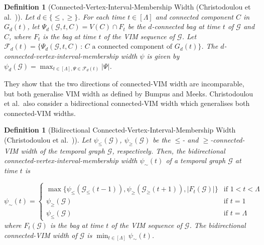 \documentclass[a4paper,UKenglish,cleveref, autoref, thm-restate]{lipics-v2021} %
\newcounter{ctheorem}
\newtheorem{defn}[ctheorem]{Definition}
\begin{document}
\begin{defn}[Connected-Vertex-Interval-Membership Width (Christodoulou et al.~\cite{christodoulou_making_2024})]\label{def:CVIM}
    Let $d\in\{\leq, \geq\}$. For each time $t\in[\Lambda]$ and connected component $C$ in $G_{d}(t)$, let $\Psi_d(\mathcal{G},t,C)=V(C)\cap F_t$ be the $d$\emph{-connected bag} at time $t$ of $\mathcal{G}$ and $C$, where $F_t$ is the bag at time $t$ of the VIM sequence of $\mathcal{G}$. Let $\mathcal{F}_d(t)=\{\Psi_d(\mathcal{G},t,C)\, :\, C\text{ a connected component of }G_d(t)\}$. The \emph{$d$-connected-vertex-interval-membership width} $\psi$ is given by $\psi_d(\mathcal{G})=\max_{t\in[\Lambda],\Psi\in\mathcal{F}_d(t)}|\Psi|$.
\end{defn}
They show that the two directions of connected-VIM width are incomparable, but both generalise VIM width as defined by Bumpus and Meeks. Christodoulou et al.~also consider a bidirectional connected-VIM width which generalises both connected-VIM widths.%
\begin{defn}[Bidirectional Connected-Vertex-Interval-Membership Width (Christodoulou et al.~\cite{christodoulou_making_2024})]
    Let $\psi_{\leq}(\mathcal{G})$, $\psi_{\geq}(\mathcal{G})$ be the $\leq$- and $\geq$-connected-VIM width of the temporal graph $\mathcal{G}$, respectively. Then, the bidirectional connected-vertex-interval-membership width $\psi_{\sim}(t)$ of a temporal graph $\mathcal{G}$ at time $t$ is
    
    $
       \psi_{\sim}(t) =\left\{ \begin{array}{ll} \max\{\psi_{\leq}(\mathcal{G}_{\leq}(t-1)),\psi_{\geq}(\mathcal{G}_{\geq}(t+1)), |F_t(\mathcal{G})|\} & \text{if }1<t<\Lambda\\
       \psi_{\geq}(\mathcal{G}) & \text{if } t=1\\
       \psi_{\leq}(\mathcal{G}) & \text{if }t=\Lambda
       \end{array}
       \right.        
    $\\
    where $F_t(\mathcal{G})$ is the bag at time $t$ of the VIM sequence of $\mathcal{G}$.
    The \emph{bidirectional connected-VIM width} of $\mathcal{G}$ is $\min_{t\in[\Lambda]}\psi_{\sim}(t)$.
\end{defn}
\end{document}
